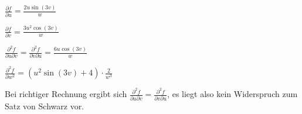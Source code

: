 \item

$\frac{\partial f}{\partial u} = \frac{2u\sin(3v)}{w}$

$\frac{\partial f}{\partial v} = \frac{3u^2\cos(3v)}{w}$

$\frac{\partial^2 f}{\partial u \partial v} = \frac{\partial^2 f}{\partial v \partial u} = \frac{6u \cos(3v)}{w}$

$\frac{\partial^2 f}{\partial w^2} = (u^2\sin(3v)+4)\cdot \frac{2}{w^3}$

Bei richtiger Rechnung ergibt sich $\frac{\partial^2 f}{\partial u \partial v} = \frac{\partial^2 f}{\partial v \partial u}$, es liegt also kein Widerspruch zum Satz von Schwarz vor. 

